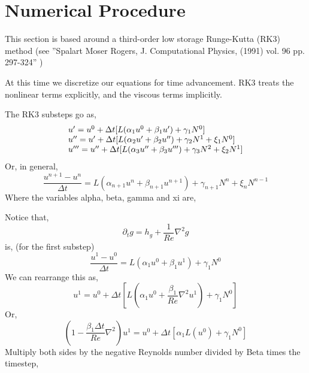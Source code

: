 \documentclass{article}
\begin{document}
\newpage
\section{Numerical Procedure}

This section is based around a third-order low storage Runge-Kutta (RK3) method (see ''Spalart Moser Rogers, J. Computational Physics, (1991) vol. 96 pp. 297-324'' )

At this time we discretize our equations for time advancement. RK3 treats the nonlinear terms explicitly, and the viscous terms implicitly.

The RK3 substeps go as,
\begin{equation}
  \begin{array}{l l}
    u'=u^0   + \Delta t[L(\alpha_1 u^0 + \beta_1 u') + \gamma_1 N^0] \\
    u''=u'   + \Delta t[L(\alpha_2 u' + \beta_2 u'') + \gamma_2 N^1 + \xi_1 N^0] \\
    u'''=u'' + \Delta t[L(\alpha_3 u'' + \beta_3 u''') + \gamma_3 N^2 + \xi_2 N^1] \\ \end{array}
\end{equation}
Or, in general, 
\begin{equation}
  \frac{u^{n+1} - u^{n}}{\Delta t} = L(\alpha_{n+1} u^n + \beta_{n+1} u^{n+1}) + \gamma_{n+1} N^n + \xi_{n} N^{n-1}
\end{equation}
Where the variables alpha, beta, gamma and xi are,


Notice that,
\begin{equation} 
  \partial_t g = h_g + \frac{1}{Re}\nabla^2 g
\end{equation}
is, (for the first substep)
\begin{equation} 
  \frac{u^1-u^0}{\Delta t} =  L(\alpha_1 u^0 + \beta_1 u^1) + \gamma_1 N^0
\end{equation}
We can rearrange this as,
\begin{equation} 
  u^1= u^0 + \Delta t[L( \alpha_1 u^0 + \frac{\beta_1}{Re} \nabla^2 u^1) + \gamma_1 N^0]
\end{equation}
Or,
\begin{equation} 
  (1 - \frac{\beta_1 \Delta t}{Re} \nabla^2) u^1= u^0 + \Delta t[ \alpha_1 L(u^0) + \gamma_1 N^0]
\end{equation}
Multiply both sides by the negative Reynolds number divided by Beta times the timestep,
\end{document}
